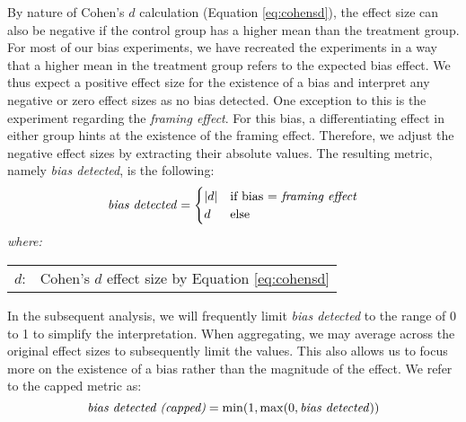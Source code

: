 \par By nature of Cohen's $d$ calculation (Equation \ref{eq:cohensd}), the effect size can also be negative if the control group has a higher mean than the treatment group. For most of our bias experiments, we have recreated the experiments in a way that a higher mean in the treatment group refers to the expected bias effect. We thus expect a positive effect size for the existence of a bias and interpret any negative or zero effect sizes as no bias detected. One exception to this is the experiment regarding the \textit{framing effect}. For this bias, a differentiating effect in either group hints at the existence of the framing effect. Therefore, we adjust the negative effect sizes by extracting their absolute values. The resulting metric, namely \textit{bias detected}, is the following:
\begin{equation} \label{eq:bias_detected}
    \text{\textit{bias detected}} =
    \begin{cases}
        |d| & \text{if bias = \textit{framing effect}} \\
        d & \text{else}
    \end{cases}
\end{equation}
\hspace{0.5cm} \textit{where:} \\
\hspace*{3em}
\begin{tabular}{rl}
    $d$:& Cohen's $d$ effect size by Equation \ref{eq:cohensd} \\
\end{tabular}

\par In the subsequent analysis, we will frequently limit \textit{bias detected} to the range of 0 to 1 to simplify the interpretation. When aggregating, we may average across the original effect sizes to subsequently limit the values. This also allows us to focus more on the existence of a bias rather than the magnitude of the effect. We refer to the capped metric as:
\begin{equation} \label{eq:bias_detected_capped}
    \text{\textit{bias detected (capped)}} = \min(1, \max(0, \text{\textit{bias detected}}))
\end{equation}


